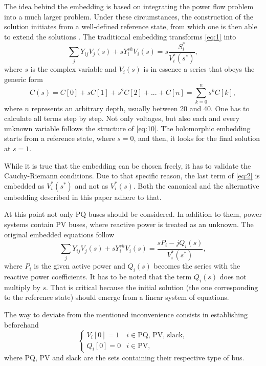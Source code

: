 \documentclass[conference]{IEEEtran}
\begin{document}
The idea behind the embedding is based on integrating the power flow problem into a much larger problem. Under these circumstances, the construction of the solution initiates from a well-defined reference state, from which one is then able to extend the solutions \cite{Trias2018}. The traditional embedding transforms \eqref{eq:1} into
\begin{equation}
   \sum_{j} Y_{ij}V_j(s) + sY_i^{sh}V_i(s)=s\frac{S^*_i}{V^*_i(s^*)},\label{eq:2}
\end{equation}
where $s$ is the complex variable and $V_i(s)$ is in essence a series that obeys the generic form
\begin{equation}
  C(s)=C[0]+sC[1]+s^2C[2]+...+C[n]=\sum_{k=0}^{n}s^kC[k],\label{eq:10}
\end{equation}
where $n$ represents an arbitrary depth, usually between 20 and 40. One has to calculate all terms step by step. Not only voltages, but also each and every unknown variable follows the structure of \eqref{eq:10}. The holomorphic embedding starts from a reference state, where $s=0$, and then, it looks for the final solution at $s=1$. 

While it is true that the embedding can be chosen freely, it has to validate the Cauchy-Riemann conditions. Due to that specific reason, the last term of \eqref{eq:2} is embedded as $V^*_i(s^*)$ and not as $V^*_i(s)$. Both the canonical and the alternative embedding described in this paper adhere to that.  

At this point not only PQ buses should be considered. In addition to them, power systems contain PV buses, where reactive power is treated as an unknown. The original embedded equations follow
\begin{equation}
   \sum_{j} Y_{ij}V_j(s) + sY_i^{sh}V_i(s)=\frac{sP_i-jQ_i(s)}{V^*_i(s^*)},\label{eq:3}
\end{equation}
where $P_i$ is the given active power and $Q_i(s)$ becomes the series with the reactive power coefficients. It has to be noted that the term $Q_i(s)$ does not multiply by $s$. That is critical because the initial solution (the one corresponding to the reference state) should emerge from a linear system of equations. 

The way to deviate from the mentioned inconvenience consists in establishing beforehand
\begin{equation}
  \begin{cases}
  V_i[0]=1 & i\in \text{PQ, PV, slack},\\
  Q_i[0]=0 & i\in \text{PV},
  \end{cases}
  \label{eq:4}
\end{equation}
where PQ, PV and slack are the sets containing their respective type of bus.
\end{document}
